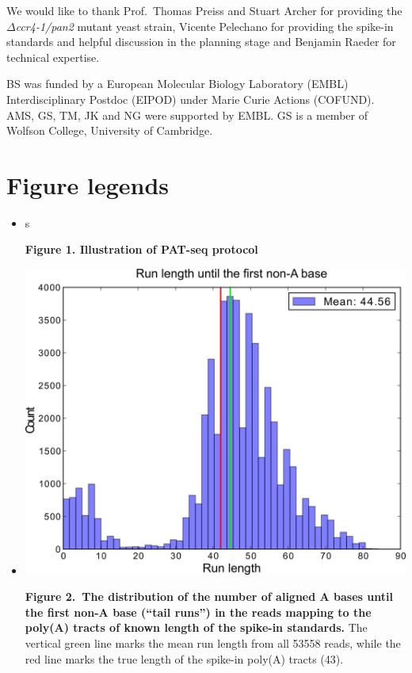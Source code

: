\documentclass[10pt]{article}
\begin{document}
We would like to thank Prof.\ Thomas Preiss and Stuart Archer for providing the \textit{$\Delta$ccr4-1/pan2} mutant yeast strain, Vicente Pelechano for providing the spike-in standards and helpful discussion in the planning stage and Benjamin Raeder for technical expertise.

BS was funded by a European Molecular Biology Laboratory (EMBL) Interdisciplinary Postdoc (EIPOD) under Marie Curie Actions (COFUND). AMS, GS, TM, JK and NG were supported by EMBL.  GS is a member of Wolfson College, University of Cambridge.

 
\section*{Figure legends}

\begin{itemize}

\item[]{
s



\textbf{Figure 1. Illustration of PAT-seq protocol}
}








\item[]{
\includegraphics[scale=0.8]{Figure2.png}

\textbf{Figure 2.~The distribution of the number of aligned A bases until the first non-A base (``tail runs'') in the reads mapping to the poly(A) tracts of known length of the spike-in standards.} The vertical green line marks the mean run length from all 53558 reads, while the red line marks the true length of the spike-in poly(A) tracts (43).}





\end{itemize}
\end{document}
